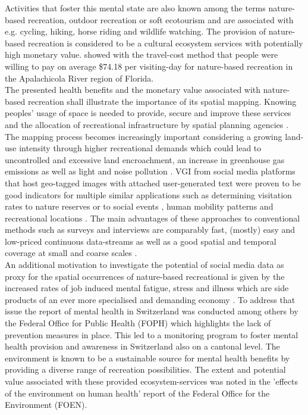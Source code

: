 Activities that foster this mental state are also known among the terms nature-based recreation, outdoor recreation or soft ecotourism \parencite{Deng2002, Balmford2009} and are associated with e.g. cycling, hiking, horse riding and wildlife watching. The provision of nature-based recreation is considered to be a cultural ecosystem services \parencite{Weyland2014, Richards2018, Yoshimura2017} with potentially high monetary value. \textcite{Shrestha2007} showed with the travel-cost method that people were willing to pay on average \$74.18 per visiting-day for nature-based recreation in the Apalachicola River region of Florida. \\
The presented health benefits and the monetary value associated with nature-based recreation shall illustrate the importance of its spatial mapping. Knowing peoples' usage of space is needed to provide, secure and improve these services and the allocation of recreational infrastructure by spatial planning agencies \parencite{Sen2014}. The mapping process becomes increasingly important considering a growing land-use intensity through higher recreational demands which could lead to uncontrolled and excessive land encroachment, an increase in greenhouse gas emissions as well as light and noise pollution \parencite{Song2018}.
VGI from social media platforms that host geo-tagged images with attached user-generated text were proven to be good indicators for multiple similar applications such as determining visitation rates to nature reserves \parencite{Tenkanen2017, Heikinheimo2017, Keeler2015, Wood2013, Fisher2018} or to social events \parencite{Pettersson2011}, human mobility patterns \parencite{Barchiesi2015, Grossenbacher2014} and recreational locations \parencite{Weyland2014, Hill2006, Neuvonen2010}. The main advantages of these approaches to conventional methods such as surveys and interviews are comparably fast, (mostly) easy and low-priced \parencite{Richards2018} continuous data-streams as well as a good spatial and temporal coverage at small \parencite{Buckee2015b} and coarse scales \parencite{Weyland2014}. \\
An additional motivation to investigate the potential of social media data as proxy for the spatial occurrences of nature-based recreational is given by the increased rates of job induced mental fatigue, stress and illness which are side products of an ever more specialised and demanding economy \parencite{Trenberth2002}. To address that issue the report of mental health in Switzerland \parencite{Ruesch2003} was conducted among others by the Federal Office for Public Health (FOPH) which highlights the lack of prevention measures in place. This led to a monitoring program to foster mental health provision and awareness in Switzerland \parencite{Schuler2012} also on a cantonal level. The environment is known to be a sustainable source for mental health benefits by providing a diverse range of recreation possibilities. The extent and potential value associated with these provided ecosystem-services was noted in the 'effects of the environment on human health' report \parencite{Ragettli2017} of the Federal Office for the Environment (FOEN).

